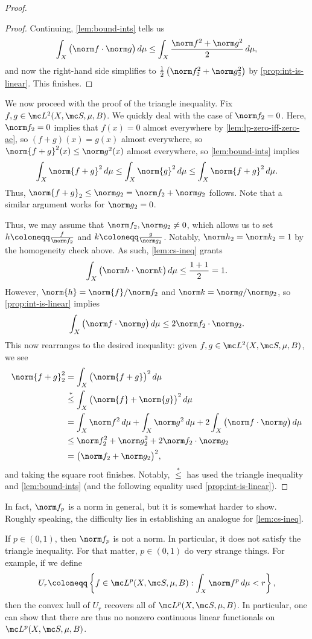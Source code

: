 \documentclass[../notes.tex]{subfiles}
\begin{document}
\begin{proof}
\begin{proof}
		Continuing, \autoref{lem:bound-ints} tells us
		\[\int_X\big(\norm f\cdot\norm g\big)\,d\mu\le\int_X\frac{\norm f^2+\norm g^2}2\,d\mu,\]
		and now the right-hand side simplifies to $\frac12\left(\norm f_2^2+\norm g_2^2\right)$ by \autoref{prop:int-is-linear}. This finishes.
	\end{proof}
	We now proceed with the proof of the triangle inequality. Fix $f,g\in\mc L^2(X,\mc S,\mu,B)$. We quickly deal with the case of $\norm f_2=0$. Here, $\norm f_2=0$ implies that $f(x)=0$ almost everywhere by \autoref{lem:lp-zero-iff-zero-ae}, so $(f+g)(x)=g(x)$ almost everywhere, so $\norm{f+g}^2(x)\le\norm g^2(x)$ almost everywhere, so \autoref{lem:bound-ints} implies
	\[\int_X\norm{f+g}^2\,d\mu\le\int_X\norm{g}^2\,d\mu\le\int_X\norm{f+g}^2\,d\mu.\]
	Thus, $\norm{f+g}_2\le\norm g_2=\norm f_2+\norm g_2$ follows. Note that a similar argument works for $\norm g_2=0$.

	Thus, we may assume that $\norm f_2,\norm g_2\ne0$, which allows us to set $h\coloneqq\frac f{\norm f_2}$ and $k\coloneqq\frac g{\norm g_2}$. Notably, $\norm h_2=\norm k_2=1$ by the homogeneity check above. As such, \autoref{lem:cs-ineq} grants
	\[\int_X\big(\norm h\cdot\norm k\big)\,d\mu\le\frac{1+1}2=1.\]
	However, $\norm{h}=\norm{f}/\norm f_2$ and $\norm k=\norm g/\norm g_2$, so \autoref{prop:int-is-linear} implies
	\[\int_X\big(\norm f\cdot\norm g\big)\,d\mu\le2\norm f_2\cdot\norm g_2.\]
	This now rearranges to the desired inequality: given $f,g\in\mc L^2(X,\mc S,\mu,B)$, we see
	\begin{align*}
		\norm{f+g}_2^2 &= \int_X\big(\norm{f+g}\big)^2\,d\mu \\
		&\stackrel*\le \int_X\big(\norm{f}+\norm{g}\big)^2\,d\mu \\
		&= \int_X\norm f^2\,d\mu+\int_X\norm g^2\,d\mu+2\int_X\big(\norm f\cdot\norm g\big)\,d\mu \\
		&\le \norm f_2^2+\norm g_2^2+2\norm f_2\cdot\norm g_2 \\
		&= \big(\norm f_2+\norm g_2\big)^2,
	\end{align*}
	and taking the square root finishes. Notably, $\stackrel*\le$ has used the triangle inequality and \autoref{lem:bound-ints} (and the following equality used \autoref{prop:int-is-linear}).
\end{proof}
\begin{remark}
	In fact, $\norm f_p$ is a norm in general, but it is somewhat harder to show. Roughly speaking, the difficulty lies in establishing an analogue for \autoref{lem:cs-ineq}.
\end{remark}
\begin{remark}
	If $p\in(0,1)$, then $\norm f_p$ is not a norm. In particular, it does not satisfy the triangle inequality. For that matter, $p\in(0,1)$ do very strange things. For example, if we define
	\[U_r\coloneqq\left\{f\in\mc L^p(X,\mc S,\mu,B):\int_X\norm f^p\,d\mu<r\right\},\]
	then the convex hull of $U_r$ recovers all of $\mc L^p(X,\mc S,\mu,B)$. In particular, one can show that there are thus no nonzero continuous linear functionals on $\mc L^p(X,\mc S,\mu,B)$.
\end{remark}
\end{document}
